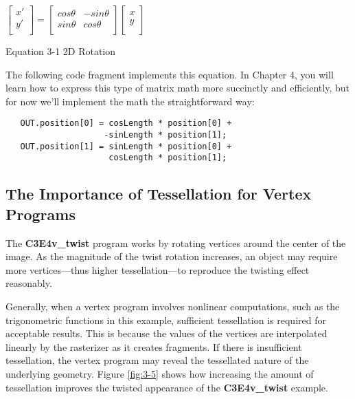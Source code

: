 \documentclass[../main.tex]{subfiles}
\begin{document}
\FloatBarrier
\begin{equationcaption}
\centering
$
\begin{bmatrix}
x' \\
y' \\
\end{bmatrix}
= 
\begin{bmatrix}
cos \theta & -sin \theta \\
sin \theta & cos \theta \\
\end{bmatrix}
\begin{bmatrix}
x \\
y \\
\end{bmatrix}
$
\caption{Equation 3-1 2D Rotation}
\end{equationcaption}
\FloatBarrier

The following code fragment implements this equation. In Chapter 4, you will learn how to express this type of matrix math more succinctly and efficiently, but for now we'll implement the math the straightforward way:

\FloatBarrier
\begin{lstlisting}
   OUT.position[0] = cosLength * position[0] +
                    -sinLength * position[1];
   OUT.position[1] = sinLength * position[0] +
                     cosLength * position[1];
\end{lstlisting}
\FloatBarrier

\subsection*{The Importance of Tessellation for Vertex Programs}

The \textbf{C3E4v_twist} program works by rotating vertices around the center of the image. As the magnitude of the twist rotation increases, an object may require more vertices—thus higher tessellation—to reproduce the twisting effect reasonably.

Generally, when a vertex program involves nonlinear computations, such as the trigonometric functions in this example, sufficient tessellation is required for acceptable results. This is because the values of the vertices are interpolated linearly by the rasterizer as it creates fragments. If there is insufficient tessellation, the vertex program may reveal the tessellated nature of the underlying geometry. Figure \ref{fig:3-5} shows how increasing the amount of tessellation improves the twisted appearance of the \textbf{C3E4v_twist} example.
\end{document}
